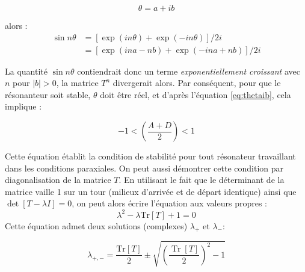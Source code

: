 \documentclass[a4paper]{article}
\DeclareMathOperator{\Tr}{Tr}
\begin{document}
\begin{equation}
\label{eq:thetaib}
    \theta = a + ib
\end{equation}

alors : 
\begin{align*}
     \sin n\theta &= \left[\exp(in\theta)+\exp(-in\theta)\right]/2i \\
     &=\left[\exp(ina - nb)+\exp(-ina + nb)\right]/2i 
\end{align*}

La quantité $\sin n\theta$ contiendrait donc un terme \textit{exponentiellement croissant} avec $n$ pour $|b|>0$, la matrice $T^n$ divergerait alors. Par conséquent, pour que le résonanteur soit stable, $\theta$ doit être réel, et d'après l'équation \ref{eq:thetaib}, cela implique :

\begin{equation}
\label{eq:stab}
 -1<\left(\frac{A+D}{2}\right)<1
\end{equation}

Cette équation établit la condition de stabilité pour tout résonateur travaillant dans les conditions paraxiales. 
On peut aussi démontrer cette condition par diagonalisation de la matrice $T$. 
En utilisant le fait que le déterminant de la matrice vaille 1 sur un tour (milieux d'arrivée et de départ identique) ainsi que $\det\left[T-\lambda I\right] = 0$, on peut alors écrire l'équation aux valeurs propres :
\begin{equation}
\lambda^2- \lambda \mathrm{Tr}\left[T\right]+1 = 0
\end{equation}
Cette équation admet deux solutions (complexes) $\lambda_+$ et  $\lambda_-$:

\begin{equation}
    \lambda_{+, -}=
    \frac{\mathrm{Tr}\left[T\right]}{2}
    \pm
    \sqrt{
    \left(
    \frac{\Tr\left[T\right]}
    {2}
    \right)^2-1
    }
\end{equation}




\end{document}
